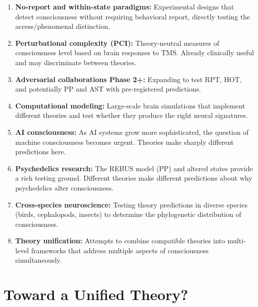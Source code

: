 \documentclass[11pt,a4paper]{report}
\begin{document}
\begin{futurebox}
\begin{enumerate}[leftmargin=1.5em]
  \item \textbf{No-report and within-state paradigms:} Experimental designs that detect consciousness without requiring behavioral report, directly testing the access/phenomenal distinction.

  \item \textbf{Perturbational complexity (PCI):} Theory-neutral measures of consciousness level based on brain responses to TMS. Already clinically useful and may discriminate between theories.

  \item \textbf{Adversarial collaborations Phase 2+:} Expanding to test RPT, HOT, and potentially PP and AST with pre-registered predictions.

  \item \textbf{Computational modeling:} Large-scale brain simulations that implement different theories and test whether they produce the right neural signatures.

  \item \textbf{AI consciousness:} As AI systems grow more sophisticated, the question of machine consciousness becomes urgent. Theories make sharply different predictions here.

  \item \textbf{Psychedelics research:} The REBUS model (PP) and altered states provide a rich testing ground. Different theories make different predictions about why psychedelics alter consciousness.

  \item \textbf{Cross-species neuroscience:} Testing theory predictions in diverse species (birds, cephalopods, insects) to determine the phylogenetic distribution of consciousness.

  \item \textbf{Theory unification:} Attempts to combine compatible theories into multi-level frameworks that address multiple aspects of consciousness simultaneously.
\end{enumerate}
\end{futurebox}

\section{Toward a Unified Theory?}
\end{document}
